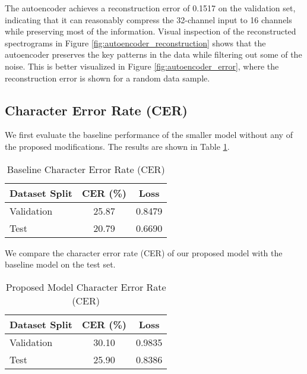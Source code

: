 The autoencoder achieves a reconstruction error of 0.1517 on the validation set, indicating that it can reasonably compress the 32-channel input to 16 channels while preserving most of the information. Visual inspection of the reconstructed spectrograms in Figure \ref{fig:autoencoder_reconstruction} shows that the autoencoder preserves the key patterns in the data while filtering out some of the noise. This is better visualized in Figure \ref{fig:autoencoder_error}, where the reconstruction error is shown for a random data sample.

\subsection{Character Error Rate (CER)}

We first evaluate the baseline performance of the smaller model without any of the proposed modifications. The results are shown in Table \ref{tab:baseline_cer}.

\begin{table}[h]
    \centering
    \caption{Baseline Character Error Rate (CER)}
    \begin{tabular}{lcc}
        \hline
        \textbf{Dataset Split} & \textbf{CER (\%)} & \textbf{Loss} \\
        \hline
        Validation             & 25.87             & 0.8479        \\
        Test                   & 20.79             & 0.6690        \\
        \hline
    \end{tabular}
    \label{tab:baseline_cer}
\end{table}

We compare the character error rate (CER) of our proposed model with the baseline model on the test set.

\begin{table}[h]
    \centering
    \caption{Proposed Model Character Error Rate (CER)}
    \begin{tabular}{lcc}
        \hline
        \textbf{Dataset Split} & \textbf{CER (\%)} & \textbf{Loss} \\
        \hline
        Validation             & 30.10             & 0.9835        \\
        Test                   & 25.90             & 0.8386        \\
        \hline
    \end{tabular}
    \label{tab:proposed_model_cer}
\end{table}

